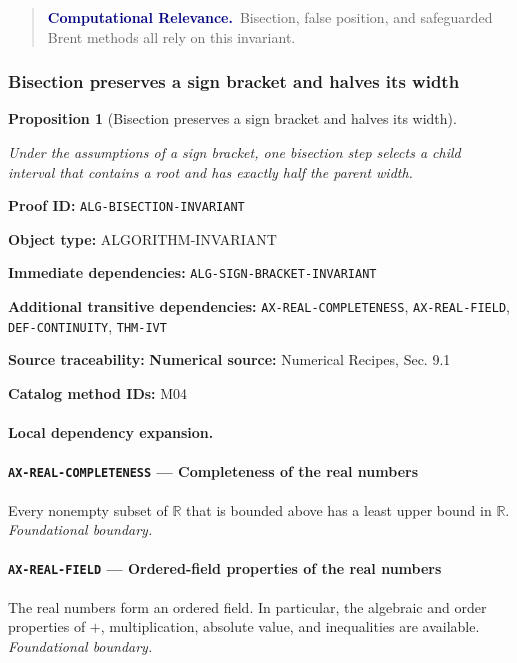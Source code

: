 \documentclass[10pt]{article}
\newcommand{\pidraw}[1]{\begingroup\urlstyle{tt}\nolinkurl{#1}\endgroup}
\newtheorem{proposition}[theorem]{Proposition}
\theoremstyle{definition}
\theoremstyle{remark}
\newenvironment{computationalrelevance}
{\begin{quote}\small\noindent\textbf{\textcolor{navy}{Computational Relevance.}}\ }
{\end{quote}}
\newcommand{\meta}[2]{\noindent\textbf{#1:} #2\par}
\begin{document}
\begin{computationalrelevance}Bisection, false position, and safeguarded Brent methods all rely on this invariant.\end{computationalrelevance}

\subsubsection{Bisection preserves a sign bracket and halves its width}

\begin{proposition}[Bisection preserves a sign bracket and halves its width]\label{prf:ALG-BISECTION-INVARIANT}

Under the assumptions of a sign bracket, one bisection step selects a child interval that contains a root and has exactly half the parent width.

\end{proposition}

\meta{Proof ID}{\pidraw{ALG-BISECTION-INVARIANT}}
\meta{Object type}{ALGORITHM-INVARIANT}
\meta{Immediate dependencies}{\pidraw{ALG-SIGN-BRACKET-INVARIANT}}
\meta{Additional transitive dependencies}{\pidraw{AX-REAL-COMPLETENESS}, \pidraw{AX-REAL-FIELD}, \pidraw{DEF-CONTINUITY}, \pidraw{THM-IVT}}
\meta{Source traceability}{\textbf{Numerical source:} Numerical Recipes, Sec. 9.1}
\meta{Catalog method IDs}{M04}

\paragraph{Local dependency expansion.}

\paragraph{\pidraw{AX-REAL-COMPLETENESS} --- Completeness of the real numbers}
Every nonempty subset of $\mathbb{R}$ that is bounded above has a least upper bound in $\mathbb{R}$.
\textit{Foundational boundary.}

\paragraph{\pidraw{AX-REAL-FIELD} --- Ordered-field properties of the real numbers}
The real numbers form an ordered field. In particular, the algebraic and order properties of $+$, multiplication, absolute value, and inequalities are available.
\textit{Foundational boundary.}
\end{document}
